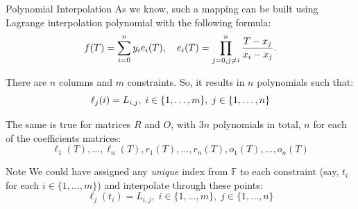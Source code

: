 \documentclass{zkdl-presentation-template}
\begin{document}
    \begin{frame}{Polynomial Interpolation}
        As we know, such a mapping can be built using Lagrange interpolation polynomial with the
        following formula:
        \vspace{-10pt}
        \begin{equation*}
            f(T) = \sum_{i=0}^{n} y_i e_i(T), \quad e_i(T) = \prod_{j=0, j \neq i}^{n} \frac{T-x_j}{x_i-x_j}.
            \vspace{-10pt}
        \end{equation*}
        \pause

        There are $n$ columns and $m$ constraints. So, it results in $n$ polynomials such that:
        \vspace{-10pt}
        \begin{equation*}
            \ell_j(i) = L_{i,j}, \; i \in \{1,\dots,m\}, \; j \in \{1,\dots,n\}
            \vspace{-10pt}
        \end{equation*}
        \pause

        The same is true for matrices $R$ and $O$, with $3n$ polynomials in total, $n$ for each of the
        coefficients matrices:
        \vspace{-8pt}
        \begin{equation*}
            \ell_1(T), \dots, \ell_n(T),
            r_1(T), \dots, r_n(T),
            o_1(T), \dots, o_n(T)
        \end{equation*}
        \pause

        \vspace{-10pt}
        \begin{remarkblock}{Note}
            We could have assigned any \textit{unique} index from $\mathbb{F}$ to each constraint
            (say, $t_i$ for each $i \in \{1,\dots,m\}$) and interpolate through these points:
            \vspace{-8pt}
            \begin{equation*}
                \ell_j(t_i) = L_{i,j}, \; i \in \{1,\dots,m\}, \; j \in \{1,\dots,n\}
            \end{equation*}
        \end{remarkblock}
    \end{frame}
\end{document}
